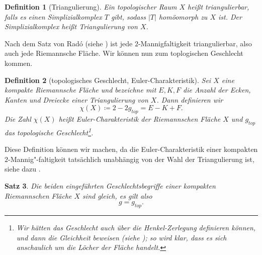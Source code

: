 \documentclass[11pt,a4paper,toc=bibliography]{scrartcl}
\theoremstyle{def}
\newtheorem{defi}{Definition}[section]
\theoremstyle{thm}
\newtheorem{satz}[defi]{Satz}
\theoremstyle{remark}
\begin{document}
\begin{defi}[Triangulierung]
Ein topologischer Raum $X$ heißt \emph{triangulierbar}, falls es einen Simplizialkomplex $T$ gibt, sodass $|T|$ homöomorph zu $X$ ist. Der Simplizialkomplex heißt \emph{Triangulierung} von $X$.
\end{defi}
Nach dem Satz von Radó (siehe \cite[~S.60]{geomTop}) ist jede $2$-Mannigfaltigkeit triangulierbar, also auch jede Riemannsche Fläche. Wir können nun zum toplogischen Geschlecht kommen.
\begin{defi}[topologisches Geschlecht, Euler-Charakteristik]
Sei $X$ eine kompakte Riemannsche Fläche und bezeichne mit $E,K,F$ die Anzahl der Ecken, Kanten und Dreiecke einer Triangulierung von $X$. Dann definieren wir
\[
\chi (X)\coloneqq 2-2g_{top}=E-K+F.
\]
Die Zahl $\chi(X)$ heißt \emph{Euler-Charakteristik} der Riemannschen Fläche $X$ und $g_{top}$ das \emph{topologische Geschlecht}\footnote{Wir hätten das Geschlecht auch über die Henkel-Zerlegung definieren können, und dann die Gleichheit beweisen (siehe \cite[~Kap. 22]{geomTop}); so wird klar, dass es sich anschaulich um die Löcher der Fläche handelt.}.
\end{defi}
Diese Definition können wir machen, da die Euler-Charakteristik einer kompakten $2$-Mannig"-faltigkeit tatsächlich unabhängig von der Wahl der Triangulierung ist, siehe dazu \cite[~S.149]{geomTop}. 
\begin{satz}
Die beiden eingeführten Geschlechtsbegriffe einer kompakten Riemannschen Fläche $X$ sind gleich, es gilt also
\[
g=g_{top}.
\]
\end{satz}
\end{document}
